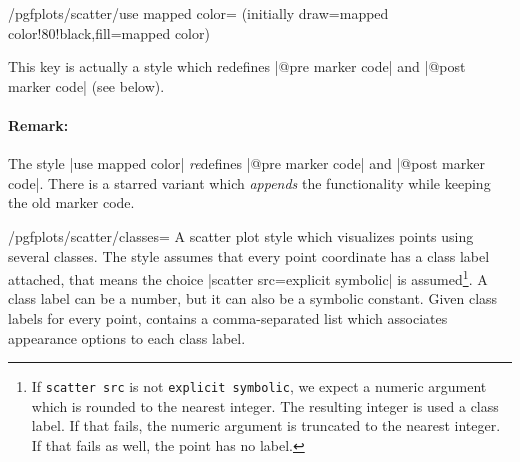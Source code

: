 {\begin{stylekey}{/pgfplots/scatter/use mapped color= (initially draw=mapped color!80!black,fill=mapped color)}
\begin{codeexample}[]
\end{codeexample}
	This key is actually a style which redefines |@pre marker code| and |@post marker code| (see below).

	\paragraph{Remark:} The style |use mapped color| \emph{re}defines |@pre marker code| and |@post marker code|. There is a starred variant  which \emph{appends} the functionality while keeping the old marker code.
\end{stylekey}

\begin{stylekey}{/pgfplots/scatter/classes=}
\label{pgfplots:scatterclasses}
	A scatter plot style which visualizes points using several classes. The style assumes that every point coordinate has a class label attached, that means the choice |scatter src=explicit symbolic| is assumed\footnote{If \texttt{scatter src} is not \texttt{explicit symbolic}, we expect a numeric argument which is rounded to the nearest integer. The resulting integer is used a class label. If that fails, the numeric argument is truncated to the nearest integer. If that fails as well, the point has no label.}. A class label can be a number, but it can also be a symbolic constant. Given class labels for every point,  contains a comma-separated list which associates appearance options to each class label.

\begin{codeexample}[]
\begin{tikzpicture}
\begin{axis}[scatter/classes={
	a={mark=square*,blue},%
	b={mark=triangle*,red},%
	c={mark=o,draw=black}}]


\end{axis}
\end{tikzpicture}
\end{codeexample}
\end{stylekey}}
